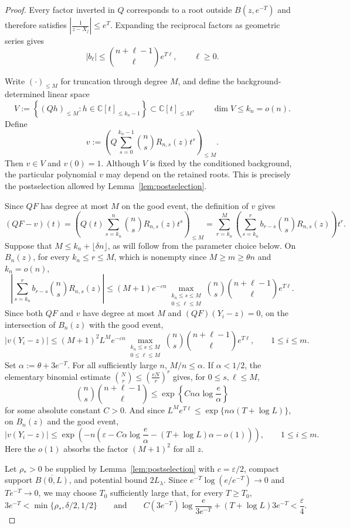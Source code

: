 \documentclass[10pt,reqno]{amsart}
\theoremstyle{remark}
\newcommand{\C}{\mathbb C}
\begin{document}
\begin{proof}
    Every factor inverted in $Q$ corresponds to a root outside $B(z,e^{-T})$ and therefore satisfies $|\frac{1}{z-X_j}| \le e^T$. Expanding the reciprocal factors as geometric series gives
    \[|b_\ell| \le \binom{n+\ell-1}{\ell}e^{T\ell}, \qquad \ell\ge0.\]
    
    Write $(\cdot)_{\le M}$ for truncation through degree $M$, and define the background-determined linear space
    \[V:=\left\{(Qh)_{\le M}:h\in\C[t]_{\le k_n-1}\right\}
    \subset \C[t]_{\le M},\qquad\dim V\le k_n=o(n).\]
    Define 
    \[v:=\left(Q\sum_{s=0}^{k_n-1}\binom{n}{s}R_{n,s}(z)t^s\right)_{\le M}.\]
    Then $v\in V$ and $v(0)=1$.
    Although $V$ is fixed by the conditioned background, the particular polynomial $v$ may depend on the retained roots. This is precisely the postselection allowed by Lemma~\ref{lem:postselection}.
    
    Since $QF$ has degree at most $M$ on the good event, the definition of $v$ gives
    \[(QF-v)(t)
    =\left(Q(t)\sum_{s=k_n}^{n}\binom nsR_{n,s}(z)t^s\right)_{\le M} 
    =\sum_{r=k_n}^{M}\left(\sum_{s=k_n}^{r}b_{r-s}\binom nsR_{n,s}(z)\right)t^r.\]
    Suppose that $M\le k_n+\lfloor\delta n\rfloor$, as will follow from the parameter choice below. On $B_n(z)$, for every $k_n\le r\le M$, which is nonempty since $M\ge m\ge\theta n$ and $k_n=o(n)$,
    \[\left|\sum_{s=k_n}^{r}b_{r-s}\binom nsR_{n,s}(z)\right|\le(M+1)e^{-\varepsilon n}\max_{\substack{k_n\le s\le M\\0\le\ell\le M}}\binom ns\binom{n+\ell-1}{\ell}e^{T\ell}.\]
    Since both $QF$ and $v$ have degree at most $M$ and $(QF)(Y_i-z)=0$, on the intersection of $B_n(z)$ with the good event,
    \[|v(Y_i-z)|\le(M+1)^2L^M e^{-\varepsilon n}\max_{\substack{k_n\le s\le M\\0\le\ell\le M}}\binom ns\binom{n+\ell-1}{\ell}e^{T\ell},
    \qquad 1\le i\le m.\]
    Set $\alpha:=\theta+3e^{-T}$. For all sufficiently large $n$, $M/n\le\alpha$. If $\alpha<1/2$, the elementary binomial estimate $\binom Nr\le\left(\frac{eN}{r}\right)^r$ gives, for $0\le s,\ell\le M$,
    \[\binom ns\binom{n+\ell-1}{\ell}\le\exp\left\{Cn\alpha\log\frac e\alpha\right\}\]
    for some absolute constant $C>0$. And since $L^Me^{T\ell}\le\exp\{n\alpha(T+\log L)\}$, on $B_n(z)$ and the good event,
    \[|v(Y_i-z)|\le\exp\left(-n\left(\varepsilon-C\alpha\log\frac{e}{\alpha}-(T+\log L)\alpha-o(1)\right)\right),
    \qquad 1\le i\le m.\]
    Here the $o(1)$ absorbs the factor $(M+1)^2$ for all $z$.
    
    Let $\rho_*>0$ be supplied by Lemma~\ref{lem:postselection} with $c=\varepsilon/2$, compact support $\overline{B(0,L)}$, and potential bound $2L_\lambda$. Since $e^{-T}\log(e/e^{-T})\to 0$ and $Te^{-T}\to 0$, we may choose $T_0$ sufficiently large that, for every $T\ge T_0$,
    \[3e^{-T}<\min\{\rho_*,\delta/2,1/2\}
    \qquad\text{and}\qquad
    C(3e^{-T})\log\frac{e}{3e^{-T}}+(T+\log L)3e^{-T}<\frac{\varepsilon}{4}.\]


\end{proof}
\end{document}
